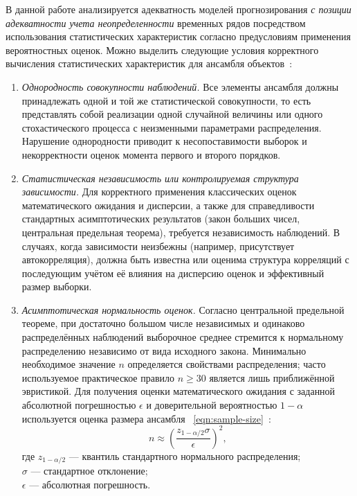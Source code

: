 В данной работе анализируется адекватность моделей прогнозирования \textit{с позиции адекватности учета неопределенности} временных рядов посредством использования статистических характеристик согласно предусловиям применения вероятностных оценок. Можно выделить следующие условия корректного вычисления статистических характеристик для ансамбля объектов~\cite{BrockwellDavis2016, OrlovEconometricsTS, NaumovTSForecasting}:
\begin{enumerate}
\item \textit{Однородность совокупности наблюдений.} Все элементы ансамбля должны принадлежать одной и той же статистической совокупности, то есть представлять собой реализации одной случайной величины или одного стохастического процесса с неизменными параметрами распределения. Нарушение однородности приводит к несопоставимости выборок и некорректности оценок момента первого и второго порядков.
\item \textit{Статистическая независимость или контролируемая структура зависимости.}
Для корректного применения классических оценок математического ожидания и дисперсии, а также для справедливости стандартных асимптотических результатов (закон больших чисел, центральная предельная теорема), требуется независимость наблюдений. В случаях, когда зависимости неизбежны (например, присутствует автокорреляция), должна быть известна или оценима структура корреляций с последующим учётом её влияния на дисперсию оценок и эффективный размер выборки.
\item \textit{Асимптотическая нормальность оценок.}
Согласно центральной предельной теореме, при достаточно большом числе независимых и одинаково распределённых наблюдений выборочное среднее стремится к нормальному распределению независимо от вида исходного закона. Минимально необходимое значение $n$ определяется свойствами распределения; часто используемое практическое правило $n\ge30$ является лишь приближённой эвристикой.
Для получения оценки математического ожидания с заданной абсолютной погрешностью $\epsilon$ и доверительной вероятностью $1 - \alpha$ используется оценка размера ансамбля ~\eqref{eqn:sample-size}~\cite{BrockwellDavis2016, OrlovEconometricsTS}:
\begin{equation}
\label{eqn:sample-size}
n\approx \left(\frac{z_{1-\alpha/2}\sigma}{\epsilon}\right)^2,
\end{equation}
где $z_{1-\alpha/2}$ --- квантиль стандартного нормального распределения;\\
${}$\quad\enspace$\sigma$ --- стандартное отклонение;\\
${}$\quad\enspace$\epsilon$ --- абсолютная погрешность.
\end{enumerate}

